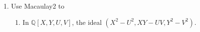 \documentclass[12pt]{amsart}
\newcommand{\Q}{\mathbb{Q}}
\begin{document}
\begin{enumerate}
\

\item Use Macaulay2 to 
\begin{enumerate}

\item In $\Q[X,Y,U,V]$, the ideal $(X^2-U^2,XY-UV,Y^2-V^2)$.


\end{enumerate}








\end{enumerate}
\end{document}
